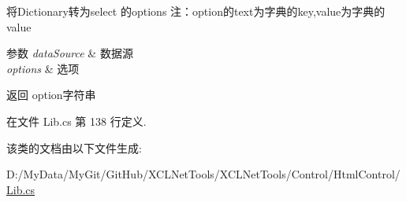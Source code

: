 将\-Dictionary转为select 的options 注：option的text为字典的key,value为字典的value 


\begin{DoxyParams}{参数}
{\em data\-Source} & 数据源\\
\hline
{\em options} & 选项\\
\hline
\end{DoxyParams}
\begin{DoxyReturn}{返回}
option字符串
\end{DoxyReturn}


在文件 Lib.\-cs 第 138 行定义.



该类的文档由以下文件生成\-:\begin{DoxyCompactItemize}
\item 
D\-:/\-My\-Data/\-My\-Git/\-Git\-Hub/\-X\-C\-L\-Net\-Tools/\-X\-C\-L\-Net\-Tools/\-Control/\-Html\-Control/\hyperlink{_control_2_html_control_2_lib_8cs}{Lib.\-cs}\end{DoxyCompactItemize}
